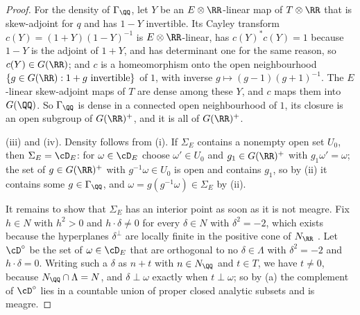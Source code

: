 \begin{proof}
For the density of $\Gamma_{\QQ}$, let $Y$ be an $E\otimes\RR$-linear map of
$T\otimes\RR$ that is skew-adjoint for $q$ and has $1-Y$ invertible. Its
Cayley transform $c(Y)=(1+Y)(1-Y)^{-1}$ is $E\otimes\RR$-linear, has
$c(Y)^{*}c(Y)=1$ because $1-Y$ is the adjoint of $1+Y$, and has determinant
one for the same reason, so $c(Y)\in G(\RR)$; and $c$ is a homeomorphism onto
the open neighbourhood $\{g\in G(\RR):1+g\ \text{invertible}\}$ of $1$, with
inverse $g\mapsto(g-1)(g+1)^{-1}$. The $E$-linear skew-adjoint maps of $T$
are dense among these $Y$, and $c$ maps them into $G(\QQ)$. So $\Gamma_{\QQ}$
is dense in a connected open neighbourhood of $1$, its closure is an open
subgroup of $G(\RR)^{+}$, and it is all of $G(\RR)^{+}$.

(iii) and (iv). Density follows from (i). If $\Sigma_{E}$ contains a nonempty
open set $U_{0}$, then $\Sigma_{E}=\cD_{E}$: for $\omega\in\cD_{E}$ choose
$\omega'\in U_{0}$ and $g_{1}\in G(\RR)^{+}$ with $g_{1}\omega'=\omega$; the
set of $g\in G(\RR)^{+}$ with $g^{-1}\omega\in U_{0}$ is open and contains
$g_{1}$, so by (ii) it contains some $g\in\Gamma_{\QQ}$, and
$\omega=g(g^{-1}\omega)\in\Sigma_{E}$ by (ii).

It remains to show that $\Sigma_{E}$ has an interior point as soon as it is
not meagre. Fix $h\in N$ with $h^{2}>0$ and $h\cdot\delta\ne0$ for every
$\delta\in N$ with $\delta^{2}=-2$, which exists because the hyperplanes
$\delta^{\perp}$ are locally finite in the positive cone of $N_{\RR}$
\cite[Ch.~8]{Huy16}. Let $\cD^{\circ}$ be the set of $\omega\in\cD_{E}$ that
are orthogonal to no $\delta\in\Lambda$ with $\delta^{2}=-2$ and
$h\cdot\delta=0$. Writing such a $\delta$ as $n+t$ with $n\in N_{\QQ}$ and
$t\in T$, we have $t\ne0$, because $N_{\QQ}\cap\Lambda=N$, and
$\delta\perp\omega$ exactly when $t\perp\omega$; so by (a) the complement of
$\cD^{\circ}$ lies in a countable union of proper closed analytic subsets and
is meagre.


\end{proof}
